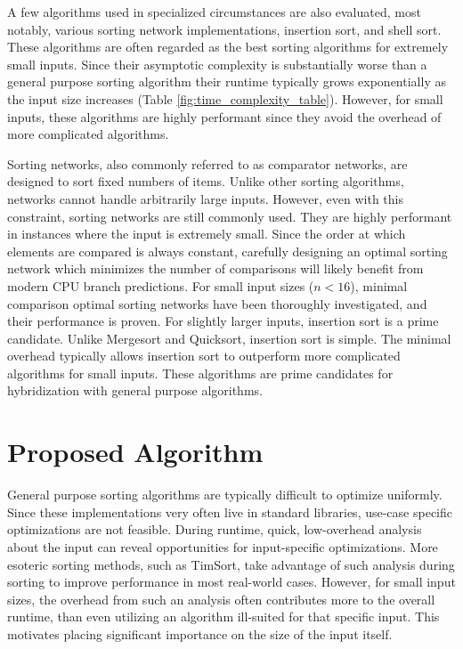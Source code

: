 \documentclass[12pt, conference]{ieeeconf}
\begin{document}
A few algorithms used in specialized circumstances are also evaluated, most
notably, various sorting network implementations, insertion sort, and shell
sort. These algorithms are often regarded as the best sorting algorithms for
extremely small inputs. Since their asymptotic complexity is substantially worse
than a general purpose sorting algorithm their runtime typically grows
exponentially as the input size increases (Table
\ref{fig:time_complexity_table}). However, for small inputs, these algorithms
are highly performant since they avoid the overhead of more complicated
algorithms.

Sorting networks, also commonly referred to as comparator networks, are designed
to sort fixed numbers of items. Unlike other sorting algorithms, networks cannot
handle arbitrarily large inputs. However, even with this constraint, sorting
networks are still commonly used. They are highly performant in instances where
the input is extremely small. Since the order at which elements are compared is
always constant, carefully designing an optimal sorting network which minimizes
the number of comparisons will likely benefit from modern CPU branch
predictions. For small input sizes ($n < 16$), minimal comparison optimal
sorting networks have been thoroughly investigated, and their performance is
proven\parencite{knuth_networks}\parencite{engineering_fast_sorters}. For
slightly larger inputs, insertion sort is a prime candidate. Unlike Mergesort
and Quicksort, insertion sort is simple. The minimal overhead typically allows
insertion sort to outperform more complicated algorithms for small inputs. These
algorithms are prime candidates for hybridization with general purpose
algorithms.


\section{Proposed Algorithm}

General purpose sorting algorithms are typically difficult to optimize
uniformly. Since these implementations very often live in standard libraries,
use-case specific optimizations are not feasible. During runtime, quick,
low-overhead analysis about the input can reveal opportunities for
input-specific optimizations. More esoteric sorting methods, such as TimSort,
take advantage of such analysis during sorting to improve performance in most
real-world cases. However, for small input sizes, the overhead from such an
analysis often contributes more to the overall runtime, than even utilizing an
algorithm ill-suited for that specific input\parencite{the_basic_algorithms}.
This motivates placing significant importance on the size of the input itself.
\end{document}
